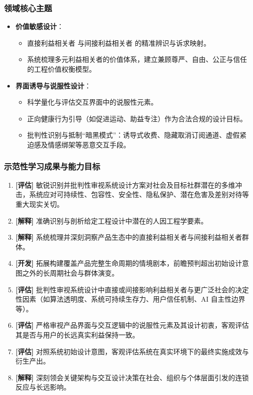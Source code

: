 \subsubsection{领域核心主题}
\begin{itemize}
    \item \textbf{价值敏感设计}：
    \begin{itemize}
        \item 直接利益相关者 与间接利益相关者 的精准辨识与诉求映射。
        \item 系统梳理多元利益相关者的价值体系，建立兼顾尊严、自由、公正与信任的工程价值权衡模型。
    \end{itemize}
    \item \textbf{界面诱导与说服性设计}：
    \begin{itemize}
        \item 科学量化与评估交互界面中的说服性元素。
        \item 正向健康行为引导（如促进运动、助益专注）作为合法合规的设计目标。
        \item 批判性识别与抵制“暗黑模式”：诱导式收费、隐藏取消订阅通道、虚假紧迫感及情感绑架等恶意交互手段。
    \end{itemize}
\end{itemize}

\subsubsection{示范性学习成果与能力目标}
\begin{enumerate}
    \item \textbf{[评估]} 敏锐识别并批判性审视系统设计方案对社会及目标社群潜在的多维冲击，系统应对可持续性、包容性、安全性、隐私保护、潜在危害及差别对待等重大现实关切。
    \item \textbf{[解释]} 准确识别与剖析给定工程设计中潜在的人因工程学要素。
    \item \textbf{[解释]} 系统梳理并深刻洞察产品生态中的直接利益相关者与间接利益相关者群体。
    \item \textbf{[开发]} 拓展构建覆盖产品完整生命周期的情境剧本，前瞻预判超出初始设计意图之外的长周期社会与群体演变。
    \item \textbf{[评估]} 批判性审视系统设计中直接或间接影响利益相关者与更广泛社会的决定性因素（如算法透明度、系统可持续生存力、用户信任机制、AI 自主性边界等）。
    \item \textbf{[评估]} 严格审视产品界面与交互逻辑中的说服性元素及其设计初衷，客观评估其是否与用户的长远真实利益保持一致。
    \item \textbf{[评估]} 对照系统初始设计意图，客观评估系统在真实环境下的最终实施成效与衍生产出。
    \item \textbf{[解释]} 深刻领会关键架构与交互设计决策在社会、组织与个体层面引发的连锁反应与长远影响。
\end{enumerate}

